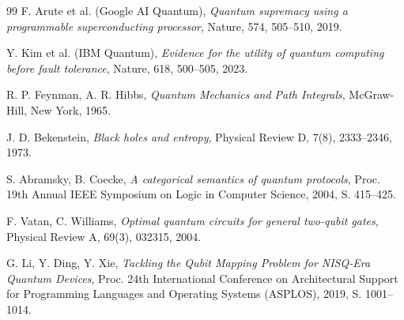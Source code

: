 ﻿\documentclass[a4paper,12pt]{article}
\theoremstyle{definition}
\begin{document}
\begin{thebibliography}{99}
F. Arute et al. (Google AI Quantum),
\textit{Quantum supremacy using a programmable superconducting processor},
Nature, 574, 505--510, 2019.

Y. Kim et al. (IBM Quantum),
\textit{Evidence for the utility of quantum computing before fault tolerance},
Nature, 618, 500--505, 2023.

R. P. Feynman, A. R. Hibbs,
\textit{Quantum Mechanics and Path Integrals},
McGraw-Hill, New York, 1965.

J. D. Bekenstein,
\textit{Black holes and entropy},
Physical Review D, 7(8), 2333--2346, 1973.

S. Abramsky, B. Coecke,
\textit{A categorical semantics of quantum protocols},
Proc. 19th Annual IEEE Symposium on Logic in Computer Science, 2004, S. 415--425.

F. Vatan, C. Williams,
\textit{Optimal quantum circuits for general two-qubit gates},
Physical Review A, 69(3), 032315, 2004.

G. Li, Y. Ding, Y. Xie,
\textit{Tackling the Qubit Mapping Problem for NISQ-Era Quantum Devices},
Proc. 24th International Conference on Architectural Support for Programming
Languages and Operating Systems (ASPLOS), 2019, S. 1001--1014.

\end{thebibliography}
\end{document}
